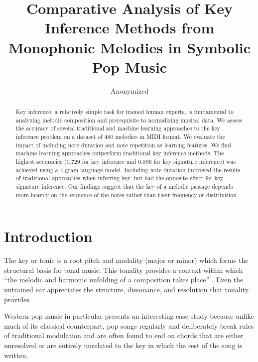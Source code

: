 \documentclass[letterpaper]{article}
\begin{document}
%
\title{Comparative Analysis of Key Inference Methods from Monophonic Melodies in Symbolic Pop Music}
\author{Anonymized}
\maketitle
\begin{abstract}
Key inference, a relatively simple task for trained human experts, is fundamental to analyzing melodic composition and prerequisite to normalizing musical data.
We assess the accuracy of several traditional and machine learning approaches to the key inference problem on a dataset of 480 melodies in MIDI format. We evaluate the impact of including note duration and note repetition as learning features.
We find machine learning approaches outperform traditional key inference methods. The highest accuracies (0.729 for key inference and 0.896 for key signature inference) was achieved using a 4-gram language model.
Including note duration improved the results of traditional approaches when inferring key, but had the opposite effect for key signature inference. Our findings suggest that the key of a melodic passage depends more heavily on the sequence of the notes rather than their frequency or distribution. 
\end{abstract}

\section{Introduction}

The key or tonic is a root pitch and modality (major or minor) which forms the structural basis for tonal music. This tonality provides a context within which ``the melodic and harmonic unfolding of a composition takes place'' \cite{vos1996parallel}. Even the untrained ear appreciates the structure, dissonance, and resolution that tonality provides.

Western pop music in particular presents an interesting case study because unlike much of its classical counterpart, pop songs regularly and deliberately break rules of traditional modulation and are often found to end on chords that are either unresolved or are entirely unrelated to the key in which the rest of the song is written.
\end{document}
